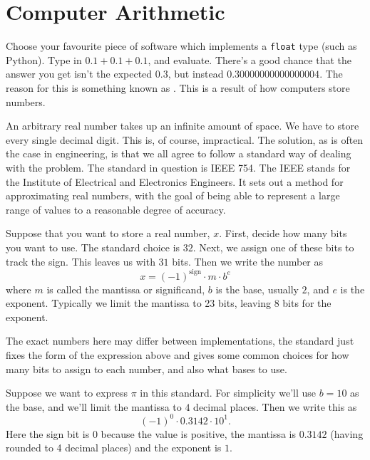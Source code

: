 \documentclass[fleqn]{LectureClass/LectureClass}
\begin{document}
    \section{Computer Arithmetic}
    Choose your favourite piece of software which implements a \lstinline[]|float| type (such as Python).
    Type in \(0.1 + 0.1 + 0.1\), and evaluate.
    There's a good chance that the answer you get isn't the expected \(0.3\), but instead \(0.30000000000000004\).
    The reason for this is something known as .
    This is a result of how computers store numbers.
    
    An arbitrary real number takes up an infinite amount of space.
    We have to store every single decimal digit.
    This is, of course, impractical.
    The solution, as is often the case in engineering, is that we all agree to follow a standard way of dealing with the problem.
    The standard in question is IEEE 754.
    The IEEE stands for the Institute of Electrical and Electronics Engineers.
    It sets out a method for approximating real numbers, with the goal of being able to represent a large range of values to a reasonable degree of accuracy.
    
    Suppose that you want to store a real number, \(x\).
    First, decide how many bits you want to use.
    The standard choice is \(32\).
    Next, we assign one of these bits to track the sign.
    This leaves us with \(31\) bits.
    Then we write the number as
    \begin{equation}
        x = (-1)^{\text{sign}} \cdot m \cdot b^e
    \end{equation}
    where \(m\) is called the mantissa or significand, \(b\) is the base, usually \(2\), and \(e\) is the exponent.
    Typically we limit the mantissa to 23 bits, leaving 8 bits for the exponent.
    
    The exact numbers here may differ between implementations, the standard just fixes the form of the expression above and gives some common choices for how many bits to assign to each number, and also what bases to use.
    
    \begin{exm}{}{}
        Suppose we want to express \(\pi\) in this standard.
        For simplicity we'll use \(b = 10\) as the base, and we'll limit the mantissa to \(4\) decimal places.
        Then we write this as
        \begin{equation}
            (-1)^0 \cdot 0.3142 \cdot 10^1.
        \end{equation}
        Here the sign bit is \(0\) because the value is positive, the mantissa is \(0.3142\) (having rounded to 4 decimal places) and the exponent is \(1\).
    \end{exm}
    
\end{document}
